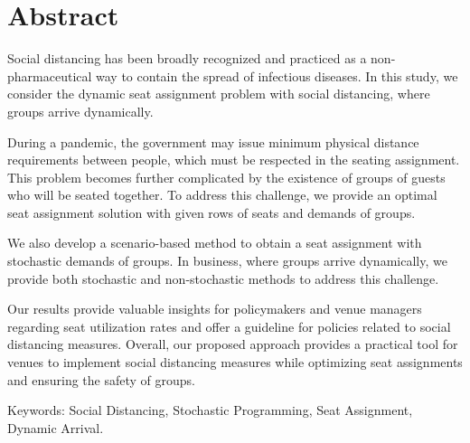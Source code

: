 
\section*{Abstract}
Social distancing has been broadly recognized and practiced as a non-pharmaceutical way to contain the spread of infectious diseases. In this study, we consider the dynamic seat assignment problem with social distancing, where groups arrive dynamically.

During a pandemic, the government may issue minimum physical distance requirements between people, which must be respected in the seating assignment. This problem becomes further complicated by the existence of groups of guests who will be seated together. To address this challenge, we provide an optimal seat assignment solution with given rows of seats and demands of groups.

We also develop a scenario-based method to obtain a seat assignment with stochastic demands of groups. In business, where groups arrive dynamically, we provide both stochastic and non-stochastic methods to address this challenge.

Our results provide valuable insights for policymakers and venue managers regarding seat utilization rates and offer a guideline for policies related to social distancing measures. Overall, our proposed approach provides a practical tool for venues to implement social distancing measures while optimizing seat assignments and ensuring the safety of groups.

Keywords: Social Distancing, Stochastic Programming, Seat Assignment, Dynamic Arrival.
